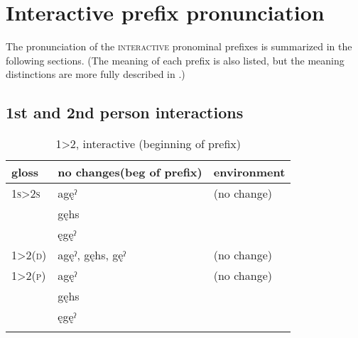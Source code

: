 \section{Interactive prefix pronunciation} \label{Interactive (GǪ) prefix meaning and pronunciation}
The pronunciation of the \textsc{interactive} pronominal prefixes is summarized in the following sections. (The meaning of each prefix is also listed, but the meaning distinctions are more fully described in .)


\newpage
\subsection{1st and 2nd person interactions}

\begin{table}
\caption{\textsc{1>2}, interactive (beginning of prefix)}
\label{figtab:1st-2nd.beginning}
{
\begin{tabularx}{\textwidth}{QQl}
\lsptoprule
gloss& no changes\newline (beg of prefix)&environment\\
\midrule 
\textsc{1s>2s} & agęˀ&(no change)\\
&gęhs&\\
&ęgęˀ&\\

\tablevspace
\midrule 
\textsc{1>2(d)}&agęˀ, gęhs, gęˀ &(no change)\\

\tablevspace
\midrule 
\textsc{1>2(p)}&agęˀ&(no change)\\
&gęhs&\\
&ęgęˀ&\\
\lspbottomrule
\end{tabularx}}
\end{table}


